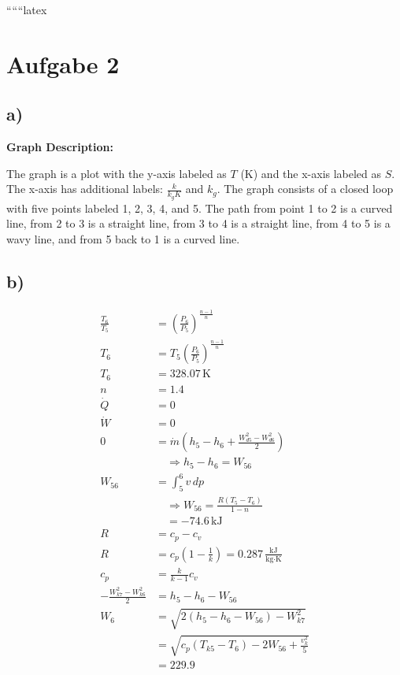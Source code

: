 
``````latex


\section*{Aufgabe 2}

\subsection*{a)}

\begin{center}
\textbf{Graph Description:}

The graph is a plot with the y-axis labeled as \( T \) (K) and the x-axis labeled as \( S \). The x-axis has additional labels: \( \frac{k}{k_g K} \) and \( k_g \). The graph consists of a closed loop with five points labeled 1, 2, 3, 4, and 5. The path from point 1 to 2 is a curved line, from 2 to 3 is a straight line, from 3 to 4 is a straight line, from 4 to 5 is a wavy line, and from 5 back to 1 is a curved line.
\end{center}

\subsection*{b)}

\begin{align*}
\frac{T_6}{T_5} &= \left( \frac{P_6}{P_5} \right)^{\frac{n-1}{n}} \\
T_6 &= T_5 \left( \frac{P_6}{P_5} \right)^{\frac{n-1}{n}} \\
T_6 &= 328.07 \, \text{K} \\
n &= 1.4 \\
\dot{Q} &= 0 \\
\dot{W} &= 0 \\
0 &= \dot{m} \left( h_5 - h_6 + \frac{W_{d5}^2 - W_{d6}^2}{2} \right) \\
&\quad \Rightarrow h_5 - h_6 = W_{56} \\
W_{56} &= \int_{5}^{6} v \, dp \\
&\quad \Rightarrow W_{56} = \frac{R(T_5 - T_6)}{1 - n} \\
&\quad = -74.6 \, \text{kJ} \\
R &= c_p - c_v \\
R &= c_p \left( 1 - \frac{1}{k} \right) = 0.287 \, \frac{\text{kJ}}{\text{kg} \cdot \text{K}} \\
c_p &= \frac{k}{k-1} c_v \\
-\frac{W_{k7}^2 - W_{k6}^2}{2} &= h_5 - h_6 - W_{56} \\
W_6 &= \sqrt{2(h_5 - h_6 - W_{56}) - W_{k7}^2} \\
&= \sqrt{c_p (T_{k5} - T_6) - 2 W_{56} + \frac{v_k^2}{5}} \\
&= 229.9
\end{align*}

